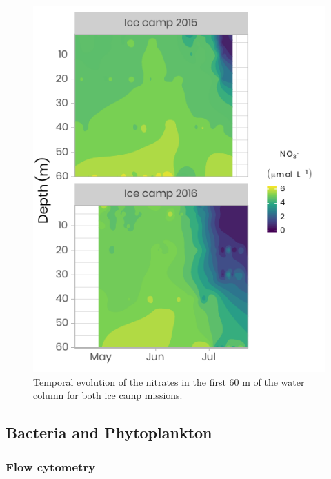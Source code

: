 \documentclass[essd, manuscript]{copernicus}
\begin{document}
\begin{figure}[H]
	\centering
	\includegraphics[scale = 1]{../../../graphs/fig08.pdf}
	\caption{Temporal evolution of the nitrates in the first 60 m of the water column for both ice camp missions.}
\end{figure}

\subsection{Bacteria and Phytoplankton}

\subsubsection{Flow cytometry}
\end{document}
